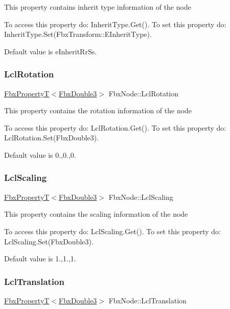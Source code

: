 This property contains inherit type information of the node

To access this property do\+: Inherit\+Type.\+Get(). To set this property do\+: Inherit\+Type.\+Set(\+Fbx\+Transform\+::\+E\+Inherit\+Type).

Default value is e\+Inherit\+Rr\+Ss. \mbox{\label{class_fbx_node_a011d40e1a84b3d64522a8ec3f20062a6}} 
\subsubsection{\texorpdfstring{Lcl\+Rotation}{LclRotation}}
{\footnotesize\ttfamily \hyperlink{class_fbx_property_t}{Fbx\+PropertyT}$<$\hyperlink{fbxtypes_8h_ae0a96f14cde566774c7553aa7523b7a7}{Fbx\+Double3}$>$ Fbx\+Node\+::\+Lcl\+Rotation}

This property contains the rotation information of the node

To access this property do\+: Lcl\+Rotation.\+Get(). To set this property do\+: Lcl\+Rotation.\+Set(\+Fbx\+Double3).

Default value is 0.,0.,0. \mbox{\label{class_fbx_node_a0a4eedf3bcdb17a7ceb8e60731f4614c}} 
\subsubsection{\texorpdfstring{Lcl\+Scaling}{LclScaling}}
{\footnotesize\ttfamily \hyperlink{class_fbx_property_t}{Fbx\+PropertyT}$<$\hyperlink{fbxtypes_8h_ae0a96f14cde566774c7553aa7523b7a7}{Fbx\+Double3}$>$ Fbx\+Node\+::\+Lcl\+Scaling}

This property contains the scaling information of the node

To access this property do\+: Lcl\+Scaling.\+Get(). To set this property do\+: Lcl\+Scaling.\+Set(\+Fbx\+Double3).

Default value is 1.,1.,1. \mbox{\label{class_fbx_node_a949dfdc30869095ed26efa68674a9142}} 
\subsubsection{\texorpdfstring{Lcl\+Translation}{LclTranslation}}
{\footnotesize\ttfamily \hyperlink{class_fbx_property_t}{Fbx\+PropertyT}$<$\hyperlink{fbxtypes_8h_ae0a96f14cde566774c7553aa7523b7a7}{Fbx\+Double3}$>$ Fbx\+Node\+::\+Lcl\+Translation}


